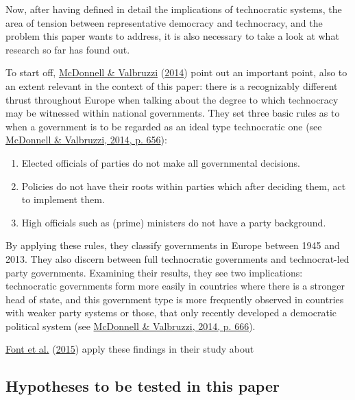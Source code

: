 \documentclass[
  12pt,
  english,
]{article}
\providecommand{\tightlist}{%
  \setlength{\itemsep}{0pt}\setlength{\parskip}{0pt}}
\begin{document}
Now, after having defined in detail the implications of technocratic
systems, the area of tension between representative democracy and
technocracy, and the problem this paper wants to address, it is also
necessary to take a look at what research so far has found out.

To start off, \protect\hyperlink{ref-mcdonnell2014defining}{McDonnell \&
Valbruzzi} (\protect\hyperlink{ref-mcdonnell2014defining}{2014}) point
out an important point, also to an extent relevant in the context of
this paper: there is a recognizably different thrust throughout Europe
when talking about the degree to which technocracy may be witnessed
within national governments. They set three basic rules as to when a
government is to be regarded as an ideal type technocratic one (see
\protect\hyperlink{ref-mcdonnell2014defining}{McDonnell \& Valbruzzi,
2014, p. 656}):

\begin{enumerate}
\def\labelenumi{\arabic{enumi}.}
\tightlist
\item
  Elected officials of parties do not make all governmental decisions.
\item
  Policies do not have their roots within parties which after deciding
  them, act to implement them.
\item
  High officials such as (prime) ministers do not have a party
  background.
\end{enumerate}

By applying these rules, they classify governments in Europe between
1945 and 2013. They also discern between full technocratic governments
and technocrat-led party governments. Examining their results, they see
two implications: technocratic governments form more easily in countries
where there is a stronger head of state, and this government type is
more frequently observed in countries with weaker party systems or
those, that only recently developed a democratic political system (see
\protect\hyperlink{ref-mcdonnell2014defining}{McDonnell \& Valbruzzi,
2014, p. 666}).

\protect\hyperlink{ref-font2015participation}{Font et al.}
(\protect\hyperlink{ref-font2015participation}{2015}) apply these
findings in their study about

\hypertarget{hypotheses-to-be-tested-in-this-paper}{%
\subsection{Hypotheses to be tested in this
paper}\label{hypotheses-to-be-tested-in-this-paper}}
\end{document}
